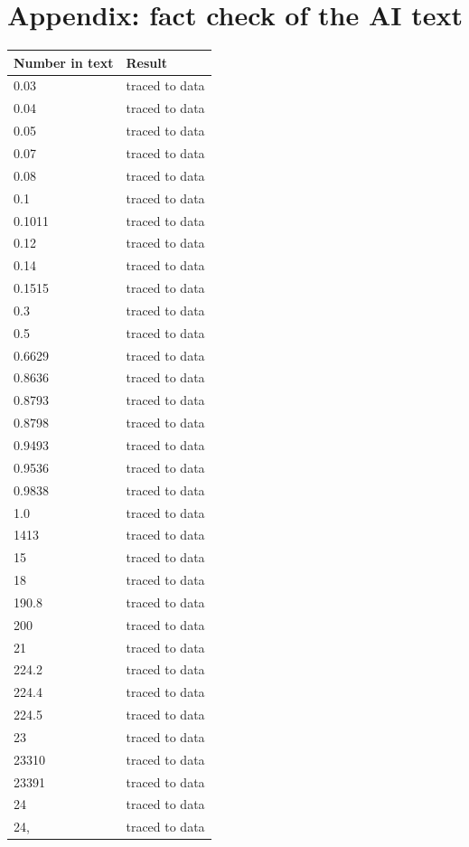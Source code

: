 \documentclass[10pt]{article}
\begin{document}
\section*{Appendix: fact check of the AI text}
{\small\begin{longtable}{p{4cm}p{5cm}}\toprule
\textbf{Number in text} & \textbf{Result} \\ \midrule \endhead
0.03 & traced to data \\
0.04 & traced to data \\
0.05 & traced to data \\
0.07 & traced to data \\
0.08 & traced to data \\
0.1 & traced to data \\
0.1011 & traced to data \\
0.12 & traced to data \\
0.14 & traced to data \\
0.1515 & traced to data \\
0.3 & traced to data \\
0.5 & traced to data \\
0.6629 & traced to data \\
0.8636 & traced to data \\
0.8793 & traced to data \\
0.8798 & traced to data \\
0.9493 & traced to data \\
0.9536 & traced to data \\
0.9838 & traced to data \\
1.0 & traced to data \\
1413 & traced to data \\
15 & traced to data \\
18 & traced to data \\
190.8 & traced to data \\
200 & traced to data \\
21 & traced to data \\
224.2 & traced to data \\
224.4 & traced to data \\
224.5 & traced to data \\
23 & traced to data \\
23310 & traced to data \\
23391 & traced to data \\
24 & traced to data \\
24, & traced to data \\

\end{longtable}}
\end{document}
